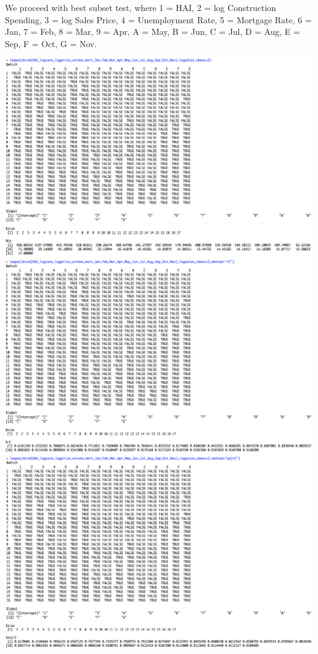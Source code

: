 \documentclass[a4 paper, 11 pt]{article}
\begin{document}
We proceed with best subset test, where 1 = HAI, 2 = log Construction Spending, 3 = log Sales Price, 4 = Unemployment Rate, 5 = Mortgage Rate, 6 = Jan, 7 = Feb, 8 = Mar, 9 = Apr, A = May, B = Jun, C = Jul, D = Aug, E = Sep, F = Oct, G = Nov.
\begin{center}
\includegraphics[scale=0.5]{best2a}
\includegraphics[scale=0.4]{best2b}
\includegraphics[scale=0.5]{r2a}
\includegraphics[scale=0.4]{r2b}
\includegraphics[scale=0.5]{adjr2a}
\includegraphics[scale=0.4]{adjr2b}
\end{center}
\end{document}
